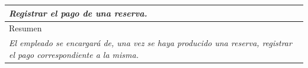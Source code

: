 \begin{table}[H]
\begin{tabular}{|llllllll|}
    \multicolumn{8}{|p{15cm}|}{{\color[HTML]{808080} \textit{Registrar el pago de una reserva.}}}                                                                                                           \\ \hline
    \multicolumn{8}{|l|}{\cellcolor[HTML]{F2F2F2}Resumen}                                                                                                                                                                            \\ \hline
    \multicolumn{8}{|p{15cm}|}{{\color[HTML]{808080} \textit{El empleado se encargará de, una vez se haya producido una reserva, registrar el pago correspondiente a la misma.}}} \\ \hline
    \end{tabular}
\end{table}

